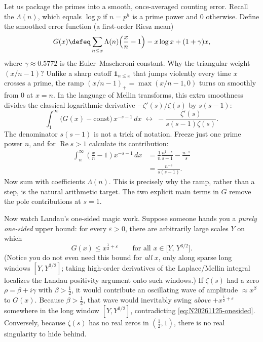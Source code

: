 Let us package the primes into a smooth, once-averaged counting error. Recall the  \(\Lambda(n)\), which equals \(\log p\) if \(n = p^h\) is a prime power and \(0\) otherwise. Define the smoothed error function (a first-order Riesz mean)
\begin{equation}
  G(x) \defeq \sum_{n \le x} \Lambda(n)\!\left(\frac{x}{n} - 1\right) - x\log x + (1+\gamma)x,
  \label{eq:N20261125-Gx}
\end{equation}
where \(\gamma \approx 0.5772\) is the Euler--Mascheroni constant. Why the triangular weight \((x/n - 1)\)? Unlike a sharp cutoff \(\mathbf{1}_{n\le x}\) that jumps violently every time \(x\) crosses a prime, the ramp \((x/n - 1)_+ = \max(x/n - 1, 0)\) turns on smoothly from \(0\) at \(x=n\). In the language of Mellin transforms, this extra smoothness divides the classical logarithmic derivative \(-\zeta'(s)/\zeta(s)\) by \(s(s-1)\):
\[
  \int_{1}^{\infty} \bigl(G(x) - \text{const}\bigr)\,x^{-s-1}\,dx
  \;\longleftrightarrow\;
  -\frac{\zeta'(s)}{s(s-1)\zeta(s)}.
\]
The denominator \(s(s-1)\) is not a trick of notation. Freeze just one prime power \(n\), and for \(\operatorname{Re}s>1\) calculate its contribution:
\[
 \begin{aligned}
 \int_n^\infty \left(\frac{x}{n}-1\right)x^{-s-1}\,dx
 &=\frac1n\frac{n^{1-s}}{s-1}-\frac{n^{-s}}s\\
 &=\frac{n^{-s}}{s(s-1)}.
 \end{aligned}
\]
Now sum with coefficients \(\Lambda(n)\). This is precisely why the ramp, rather than a step, is the natural arithmetic target. The two explicit main terms in \(G\) remove the pole contributions at \(s=1\).

Now watch Landau's one-sided magic work. Suppose someone hands you a \emph{purely one-sided} upper bound: for every \(\varepsilon > 0\), there are arbitrarily large scales \(Y\) on which
\begin{equation}
  G(x) \le x^{\frac{1}{2}+\varepsilon}
  \qquad \text{for all } x \in \bigl[Y,\, Y^{3/2}\bigr].
  \label{eq:N20261125-onesided}
\end{equation}
(Notice you do not even need this bound for \emph{all} \(x\), only along sparse long windows \([Y, Y^{3/2}]\); taking high-order derivatives of the Laplace/Mellin integral localizes the Landau positivity argument onto such windows.) If \(\zeta(s)\) had a zero \(\rho = \beta + i\gamma\) with \(\beta > \tfrac{1}{2}\), it would contribute an oscillating wave of amplitude \(\approx x^\beta\) to \(G(x)\). Because \(\beta > \tfrac{1}{2}\), that wave would inevitably swing \emph{above} \(+x^{\frac{1}{2}+\varepsilon}\) somewhere in the long window \([Y, Y^{3/2}]\), contradicting \eqref{eq:N20261125-onesided}. Conversely, because \(\zeta(s)\) has no real zeros in \((\tfrac{1}{2},1)\), there is no real singularity to hide behind.

